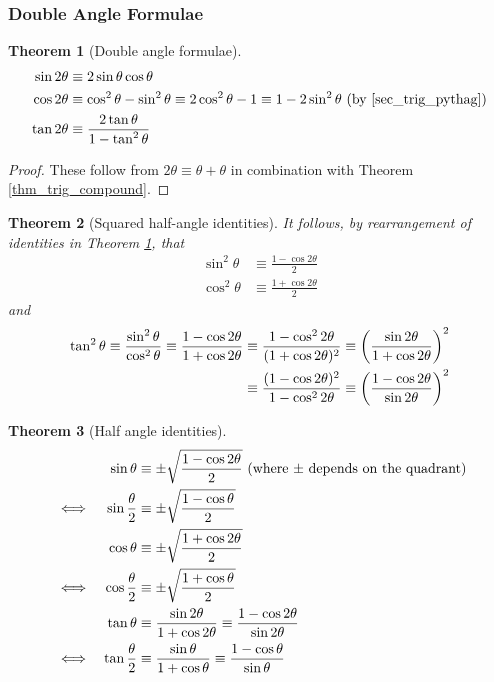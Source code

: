\documentclass[fleqn,a4paper,11pt]{article}
\newtheorem{theorem}{Theorem}[section]
\begin{document}
    \subsubsection{Double Angle Formulae} \label{sec_trig_double_angle}
    \begin{theorem}[Double angle formulae] \label{thm_trig_double_angle}
    \begin{align*}
    \sin 2\theta &\equiv
       2\sin \theta \cos \theta \\
    \cos 2\theta &\equiv
       \cos^2 \theta - \sin^2 \theta \equiv
       2\cos^2 \theta - 1 \equiv 1 - 2\sin^2 \theta
       \ \text{(by \ref{sec_trig_pythag})} \\
    \tan 2\theta &\equiv
        \frac{2\tan \theta}{1 - \tan^2 \theta}
    \end{align*}
    \end{theorem}
    \begin{proof}
    These follow from \(2\theta \equiv \theta + \theta\) in combination with
    Theorem \ref{thm_trig_compound}.
    \end{proof}
    \begin{theorem}[Squared half-angle identities]
    It follows, by rearrangement of identities in Theorem
    \ref{thm_trig_double_angle}, that
    \begin{align*}
    \sin^2 \theta &\equiv
        \frac{1 - \cos 2 \theta} 2 \\
    \cos^2 \theta &\equiv
        \frac{1 + \cos 2 \theta} 2
    \end{align*}
    and
    \begin{align*}
    \tan^2 \theta \equiv \frac{\sin^2 \theta}{\cos^2 \theta}
        \equiv \frac{1 - \cos 2 \theta}{1 + \cos 2 \theta}
        &\equiv \frac{1 - \cos^2 2 \theta}{(1 + \cos 2 \theta)^2}
        \equiv \pqty{\frac{\sin 2 \theta}{1 + \cos 2 \theta}}^2 \\
        &\equiv \frac{(1 - \cos 2 \theta)^2}{1 - \cos^2 2 \theta}
        \equiv \pqty{\frac{1 - \cos 2 \theta}{\sin 2 \theta}}^2
    \end{align*}
    \end{theorem}
    \begin{theorem}[Half angle identities] \label{thm_trig_half_angle}
    \begin{alignat*}{2}
    &&\sin \theta &\equiv
        \pm\sqrt{\frac{1 - \cos 2 \theta} 2}
     \ \pqty{\text{where \(\pm\) depends on the quadrant}} \\
    &\iff& \sin \frac \theta 2 &\equiv
        \pm\sqrt{\frac{1 - \cos \theta} 2} \\
    &&\cos \theta &\equiv
        \pm\sqrt{\frac{1 + \cos 2 \theta} 2} \\
    &\iff& \cos \frac \theta 2 &\equiv
        \pm\sqrt{\frac{1 + \cos \theta} 2} \\
    &&\tan \theta &\equiv
        \frac{\sin 2 \theta}{1 + \cos 2 \theta}
        \equiv \frac{1 - \cos 2 \theta}{\sin 2 \theta} \\
    &\iff& \tan \frac \theta 2 &\equiv
        \frac{\sin \theta}{1 + \cos \theta}
        \equiv \frac{1 - \cos \theta}{\sin \theta}
    \end{alignat*}
    \end{theorem}
\end{document}
